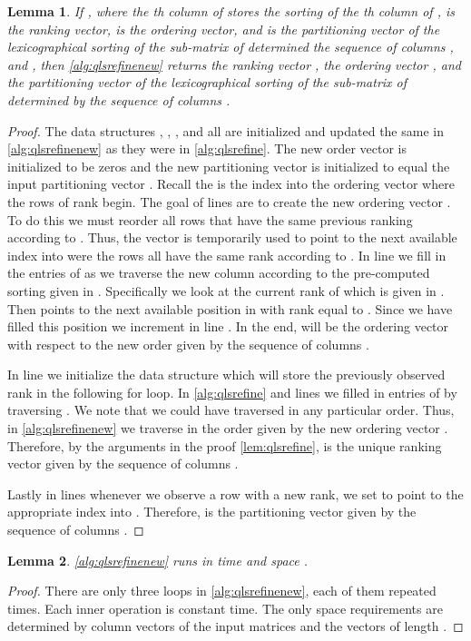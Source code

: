 \documentclass[a4paper,10pt,reqno]{amsart}
\newtheorem{lemma}{Lemma}
\theoremstyle{definition}
\begin{document}
\begin{lemma} 
\label{lem:qlsrefinenew}
If ,  where the th column of
 stores the sorting of the th column of ,  is the ranking vector,
 is the ordering vector, and  is the partitioning vector of the
lexicographical sorting of the sub-matrix of  determined the sequence of
columns , and , then
\autoref{alg:qlsrefinenew} returns the ranking vector , the ordering vector
, and the partitioning vector  of the lexicographical sorting of the
sub-matrix of  determined by the sequence of columns .
\end{lemma}
\begin{proof}
The data structures , , , and  all are
initialized and updated the same in \autoref{alg:qlsrefinenew} as they were in
\autoref{alg:qlsrefine}. The new order vector  is initialized to be zeros
and the new partitioning vector  is initialized to equal the input
partitioning vector . Recall the  is the index into the ordering vector
 where the rows of rank  begin. The goal of lines  are to create
the new ordering vector . To do this we must reorder all rows that have the
same previous ranking according to . Thus, the vector  is temporarily
used to point to the next available index into  were the rows all have the
same rank according to . In line  we fill in the entries of  as we
traverse the new column  according to the pre-computed sorting given in
. Specifically we look at the current rank of  which is
given in . Then  points to the next available
position in  with rank equal to . Since we have filled this
position  we increment  in line . In the end,  will
be the ordering vector with respect to the new order given by the sequence
of columns .

In line  we initialize the data structure  which will store the
previously observed rank in the following for loop.  In \autoref{alg:qlsrefine}
and lines  we filled in entries of  by traversing .
We note that we could have traversed  in any particular order. Thus, in
\autoref{alg:qlsrefinenew} we traverse  in the order given by the new
ordering vector .  Therefore, by the arguments in the proof
\autoref{lem:qlsrefine},  is the unique ranking vector given by the
sequence of columns . 

Lastly in lines  whenever we observe a row with a new rank, we set 
to point to the appropriate index into . Therefore,  is the 
partitioning vector given by the sequence of columns .

\end{proof}

\begin{lemma} 
\autoref{alg:qlsrefinenew} runs in time  and space .
\label{lem:qlsrefinenewruntime}
\end{lemma}
\begin{proof}
There are only three loops in \autoref{alg:qlsrefinenew}, each of them
repeated  times. Each inner operation is constant time. The only space
requirements are determined by column vectors of the  input
matrices and the vectors of length .
\end{proof}
\end{document}
